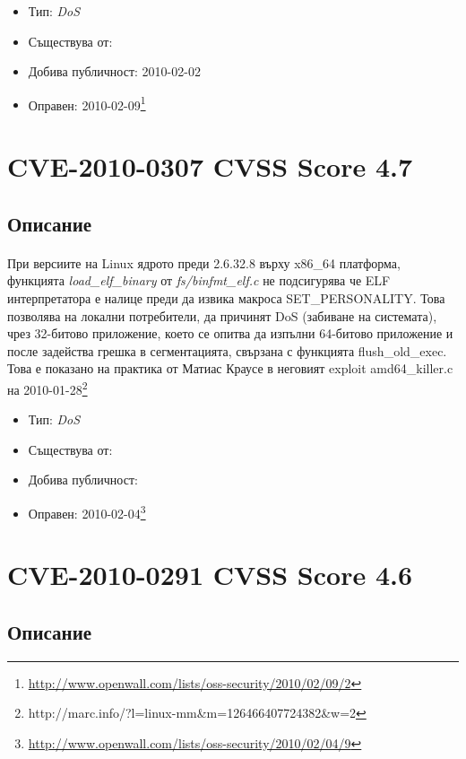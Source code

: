 \documentclass[a4paper,12pt,leqno]{article}
\begin{document}
\begin{itemize}
    \item Тип: \textit{DoS}
    \item Съществува от:
  	\item Добива публичност: 2010-02-02
    \item Оправен: 2010-02-09\footnote{\url{http://www.openwall.com/lists/oss-security/2010/02/09/2}}
\end{itemize}

\section{CVE-2010-0307 CVSS Score 4.7}
\subsection{Описание}
\paragraph{}
При версиите на Linux ядрото преди 2.6.32.8 върху x86\_64 платформа, 
функцията \textit{load\_elf\_binary} от \textit{fs/binfmt\_elf.c} не подсигурява че ELF 
интерпретатора е налице преди да извика макроса SET\_PERSONALITY. Това 
позволява на локални потребители, да причинят DoS (забиване на системата), 
чрез 32-битово приложение, което се опитва да изпълни 64-битово 
приложение и после задейства грешка в сегментацията, свързана с 
функцията flush\_old\_exec. Това е показано на практика от Матиас Краусе в 
неговият exploit amd64\_killer.c на 2010-01-28\footnote{http://marc.info/?l=linux-mm&m=126466407724382&w=2}


\begin{itemize}
    \item Тип: \textit{DoS}
    \item Съществува от:
  	\item Добива публичност: 
    \item Оправен: 2010-02-04\footnote{\url{ http://www.openwall.com/lists/oss-security/2010/02/04/9}}
\end{itemize}


\section{CVE-2010-0291 CVSS Score 4.6}
\subsection{Описание}
\end{document}
